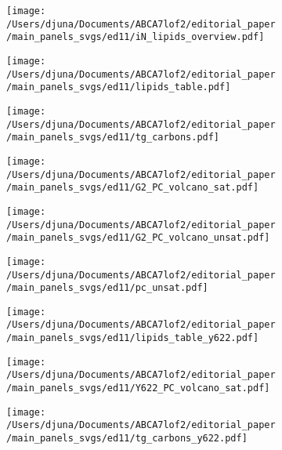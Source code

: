 \documentclass[12pt]{article}
\begin{document}
\begin{figure}[H]
    \begin{subfigure}[t]{.3\textwidth}
        \caption{}
        \texttt{[image: /Users/djuna/Documents/ABCA7lof2/editorial\_paper/main\_panels\_svgs/ed11/iN\_lipids\_overview.pdf]}        
    \end{subfigure} 
    \begin{subfigure}[t]{.3\textwidth}
        \caption{}
        \texttt{[image: /Users/djuna/Documents/ABCA7lof2/editorial\_paper/main\_panels\_svgs/ed11/lipids\_table.pdf]}        
    \end{subfigure} 
    \begin{subfigure}[t]{.3\textwidth}
        \caption{}
        \texttt{[image: /Users/djuna/Documents/ABCA7lof2/editorial\_paper/main\_panels\_svgs/ed11/tg\_carbons.pdf]}        
    \end{subfigure} 
    \begin{subfigure}[t]{.3\textwidth}
        \caption{}
        \texttt{[image: /Users/djuna/Documents/ABCA7lof2/editorial\_paper/main\_panels\_svgs/ed11/G2\_PC\_volcano\_sat.pdf]}        
    \end{subfigure} 
    \begin{subfigure}[t]{.3\textwidth}
        \caption{}
        \texttt{[image: /Users/djuna/Documents/ABCA7lof2/editorial\_paper/main\_panels\_svgs/ed11/G2\_PC\_volcano\_unsat.pdf]}        
    \end{subfigure} 
    \begin{subfigure}[t]{.3\textwidth}
        \caption{}
        \texttt{[image: /Users/djuna/Documents/ABCA7lof2/editorial\_paper/main\_panels\_svgs/ed11/pc\_unsat.pdf]}        
    \end{subfigure} 
    \begin{subfigure}[t]{.3\textwidth}
        \caption{}
        \texttt{[image: /Users/djuna/Documents/ABCA7lof2/editorial\_paper/main\_panels\_svgs/ed11/lipids\_table\_y622.pdf]}        
    \end{subfigure}
    \begin{subfigure}[t]{.3\textwidth}
        \caption{}
        \texttt{[image: /Users/djuna/Documents/ABCA7lof2/editorial\_paper/main\_panels\_svgs/ed11/Y622\_PC\_volcano\_sat.pdf]}        
    \end{subfigure} 
    \begin{subfigure}[t]{.3\textwidth}
        \caption{}
        \texttt{[image: /Users/djuna/Documents/ABCA7lof2/editorial\_paper/main\_panels\_svgs/ed11/tg\_carbons\_y622.pdf]}        

\end{subfigure}
\end{figure}
\end{document}

